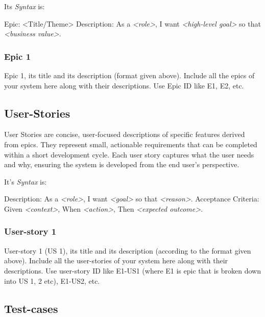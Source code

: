 Its \textit{Syntax} is:

\hspace*{2em} Epic: <Title/Theme> \newline
\hspace*{2em} Description: As a \textit{<role>}, I want \textit{<high-level goal>} so that \textit{<business value>}.

\subsubsection{Epic 1}

Epic 1, its title and its description (format given above). \newline
Include all the epics of your system here along with their descriptions. Use Epic ID like E1, E2, etc.

\subsection{User-Stories}

User Stories are concise, user-focused descriptions of specific features derived from epics. They represent small, actionable requirements that can be completed within a short development cycle. Each user story captures what the user needs and why, ensuring the system is developed from the end user's perspective.

It's \textit{Syntax} is:

\hspace*{2em} Description: As a \textit{<role>}, I want \textit{<goal>} so that \textit{<reason>}. \newline
\hspace*{2em} Acceptance Criteria: Given \textit{<context>}, When \textit{<action>}, Then \textit{<expected outcome>}.

\subsubsection{User-story 1}

User-story 1 (US 1), its title and its description (according to the format given above).
Include all the user-stories of your system here along with their descriptions. Use user-story ID like E1-US1 (where E1 is epic that is broken down into US 1, 2 etc), E1-US2, etc.

\subsection{Test-cases}

